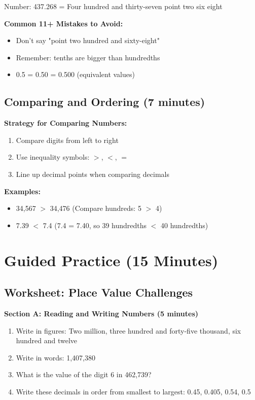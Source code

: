 \documentclass{article}
\begin{document}
Number: 437.268 = Four hundred and thirty-seven point two six eight

\textbf{Common 11+ Mistakes to Avoid:}
\begin{itemize}
    \item Don't say "point two hundred and sixty-eight"
    \item Remember: tenths are bigger than hundredths
    \item 0.5 = 0.50 = 0.500 (equivalent values)
\end{itemize}

\subsection{Comparing and Ordering (7 minutes)}

\textbf{Strategy for Comparing Numbers:}
\begin{enumerate}
    \item Compare digits from left to right
    \item Use inequality symbols: $>$, $<$, $=$
    \item Line up decimal points when comparing decimals
\end{enumerate}

\textbf{Examples:}
\begin{itemize}
    \item 34,567 $>$ 34,476 (Compare hundreds: 5 $>$ 4)
    \item 7.39 $<$ 7.4 (7.4 = 7.40, so 39 hundredths $<$ 40 hundredths)
\end{itemize}

\section{Guided Practice (15 Minutes)}

\subsection*{Worksheet: Place Value Challenges}

\textbf{Section A: Reading and Writing Numbers (5 minutes)}
\begin{enumerate}
    \item Write in figures: Two million, three hundred and forty-five thousand, six hundred and twelve
    \item Write in words: 1,407,380
    \item What is the value of the digit 6 in 462,739?
    \item Write these decimals in order from smallest to largest: 0.45, 0.405, 0.54, 0.5
\end{enumerate}
\end{document}
